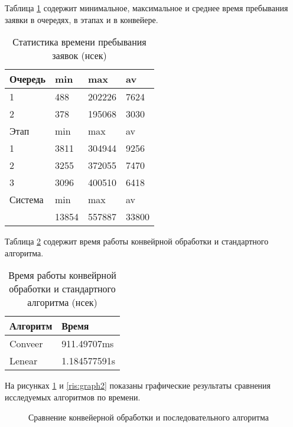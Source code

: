 Таблица \ref{tab:resulttime2} содержит минимальное, максимальное и среднее время пребывания заявки в очередях, в этапах и в конвейере.

\begin{table}[ht]
    \caption{Статистика времени пребывания заявок (нсек)}
    \centering
\begin{tabular}{ l | l | l | l  }
  Очередь&     min&     max&      av \\\hline
  1&     488&  202226&    7624 \\
  2&     378&  195068&    3030 \\ \hline
Этап&     min&     max&      av \\ \hline
  1&    3811&  304944&    9256 \\
  2&    3255&  372055&    7470 \\
  3&    3096&  400510&    6418 \\ \hline

Система&     min&     max&      av \\ \hline
   &   13854&  557887&   33800 \\

\end{tabular}
\label{tab:resulttime2}
\end{table}

Таблица \ref{tab:resulttime3} содержит время работы конвейрной обработки и стандартного алгоритма.

\begin{table}[ht]
    \caption{Время работы конвейрной обработки и стандартного алгоритма (нсек)}
    \centering
\begin{tabular}{| l | l | }
    \hline
    Алгоритм & Время \\ \hline
    Conveer &  911.49707ms \\
    Lenear  &  1.184577591s \\ \hline
\end{tabular}
\label{tab:resulttime3}
\end{table}

На рисунках \ref{ris:graph1} и \ref{ris:graph2} показаны графические результаты сравнения исследуемых алгоритмов по времени. 

\begin{figure}[H]
    \caption{Сравнение конвейерной обработки и последовательного алгоритма}
    \label{ris:graph1}
\end{figure}

